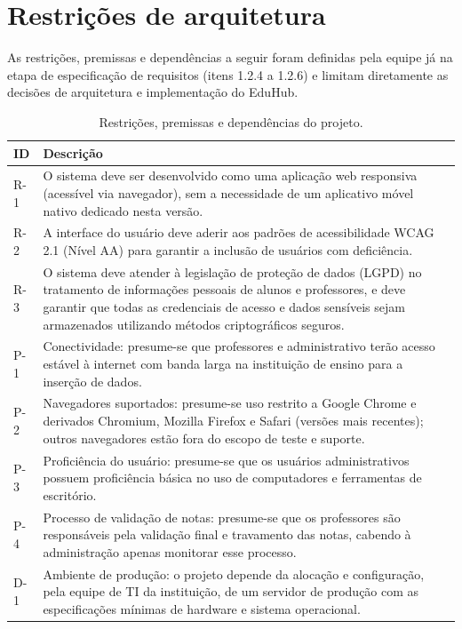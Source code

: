 \section{Restrições de arquitetura}
\label{sec:restricoes-arquitetura}

As restrições, premissas e dependências a seguir foram definidas pela equipe
já na etapa de especificação de requisitos (itens 1.2.4 a 1.2.6) e limitam
diretamente as decisões de arquitetura e implementação do EduHub.

\begin{table}[ht]
\centering
\caption{Restrições, premissas e dependências do projeto.}
\begin{tabularx}{\textwidth}{p{} X}
\toprule
\textbf{ID} & \textbf{Descrição} \\
\midrule
R-1 & O sistema deve ser desenvolvido como uma aplicação web responsiva
(acessível via navegador), sem a necessidade de um aplicativo móvel nativo
dedicado nesta versão. \\
R-2 & A interface do usuário deve aderir aos padrões de acessibilidade WCAG
2.1 (Nível AA) para garantir a inclusão de usuários com deficiência. \\
R-3 & O sistema deve atender à legislação de proteção de dados (LGPD) no
tratamento de informações pessoais de alunos e professores, e deve garantir
que todas as credenciais de acesso e dados sensíveis sejam armazenados
utilizando métodos criptográficos seguros. \\
\midrule
P-1 & Conectividade: presume-se que professores e administrativo terão
acesso estável à internet com banda larga na instituição de ensino para a
inserção de dados. \\
P-2 & Navegadores suportados: presume-se uso restrito a Google Chrome e
derivados Chromium, Mozilla Firefox e Safari (versões mais recentes); outros
navegadores estão fora do escopo de teste e suporte. \\
P-3 & Proficiência do usuário: presume-se que os usuários administrativos
possuem proficiência básica no uso de computadores e ferramentas de
escritório. \\
P-4 & Processo de validação de notas: presume-se que os professores são
responsáveis pela validação final e travamento das notas, cabendo à
administração apenas monitorar esse processo. \\
\midrule
D-1 & Ambiente de produção: o projeto depende da alocação e configuração,
pela equipe de TI da instituição, de um servidor de produção com as
especificações mínimas de hardware e sistema operacional. \\
\bottomrule
\end{tabularx}
\end{table}

